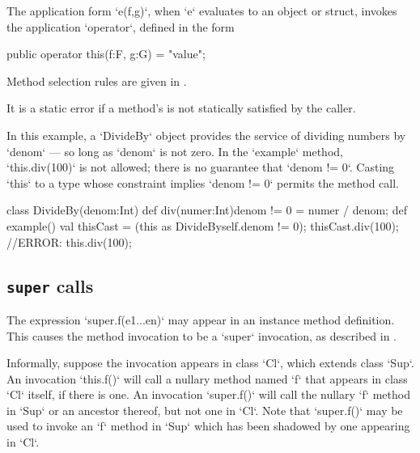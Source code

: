 The application form \xcd`e(f,g)`, when \xcd`e` evaluates to an object or
struct, invokes the application \xcd`operator`, 
defined in the form 
\begin{xten}
public operator this(f:F, g:G) = "value";
\end{xten}


Method selection rules are given in .

It is a static error if a method's  is not statically
satisfied by the 
caller.  

\begin{ex}
In this example, a \xcd`DivideBy` object provides the service of dividing
numbers by \xcd`denom` --- so long as \xcd`denom` is not zero. 
In the \xcd`example` method, \xcd`this.div(100)`  is not allowed; there is no
guarantee that \xcd`denom != 0`.  Casting \xcd`this` to a type 
whose constraint implies \xcd`denom != 0` permits the method call.
\begin{xten}
class DivideBy(denom:Int) {
  def div(numer:Int){denom != 0} = numer / denom;
  def example() {
     val thisCast = (this as DivideBy{self.denom != 0});
     thisCast.div(100);
     //ERROR: this.div(100); 
  }
}
\end{xten}
\end{ex}


\subsection{{\tt super} calls}

The expression \xcd`super.f(e1...en)` may appear in an instance method
definition.   This causes the method invocation to be a \xcd`super`
invocation, as described in .  

Informally, suppose the invocation appears in class \xcd`Cl`, which extends
class \xcd`Sup`. An invocation \xcd`this.f()` will call a nullary method named
\xcd`f` that appears in class \xcd`Cl` itself, if there is one.  An invocation
\xcd`super.f()` will call the nullary  \xcd`f` method in \xcd`Sup` or an
ancestor thereof, but not one in \xcd`Cl`.  Note that \xcd`super.f()` may be
used to invoke an \xcd`f` method in \xcd`Sup` which has been shadowed by one
appearing in \xcd`Cl`.  


